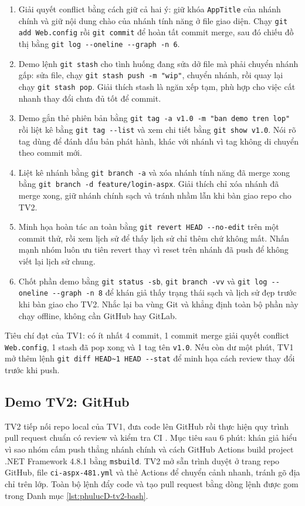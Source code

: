 \begin{enumerate}
\item Giải quyết conflict bằng cách giữ cả hai ý: giữ khóa \verb|AppTitle| của nhánh chính và giữ nội dung chào của nhánh tính năng ở file giao diện.
Chạy \verb|git add Web.config| rồi \verb|git commit| để hoàn tất commit merge, sau đó chiếu đồ thị bằng \verb|git log --oneline --graph -n 6|.
\item Demo lệnh \verb|git stash| cho tình huống đang sửa dở file mà phải chuyển nhánh gấp: sửa file, chạy \verb|git stash push -m "wip"|, chuyển nhánh, rồi quay lại chạy \verb|git stash pop|.
Giải thích stash là ngăn xếp tạm, phù hợp cho việc cất nhanh thay đổi chưa đủ tốt để commit.
\item Demo gắn thẻ phiên bản bằng \verb|git tag -a v1.0 -m "ban demo tren lop"| rồi liệt kê bằng \verb|git tag --list| và xem chi tiết bằng \verb|git show v1.0|.
Nói rõ tag dùng để đánh dấu bản phát hành, khác với nhánh vì tag không di chuyển theo commit mới.
\item Liệt kê nhánh bằng \verb|git branch -a| và xóa nhánh tính năng đã merge xong bằng \verb|git branch -d feature/login-aspx|.
Giải thích chỉ xóa nhánh đã merge xong, giữ nhánh chính sạch và tránh nhầm lẫn khi bàn giao repo cho TV2.
\item Minh họa hoàn tác an toàn bằng \verb|git revert HEAD --no-edit| trên một commit thử, rồi xem lịch sử để thấy lịch sử chỉ thêm chứ không mất.
Nhấn mạnh nhóm luôn ưu tiên revert thay vì reset trên nhánh đã push để không viết lại lịch sử chung.
\item Chốt phần demo bằng \verb|git status -sb|, \verb|git branch -vv| và \verb|git log --oneline --graph -n 8| để khán giả thấy trạng thái sạch và lịch sử đẹp trước khi bàn giao cho TV2.
Nhắc lại ba vùng Git và khẳng định toàn bộ phần này chạy offline, không cần GitHub hay GitLab.
\end{enumerate}

Tiêu chí đạt của TV1: có ít nhất 4 commit, 1 commit merge giải quyết conflict \verb|Web.config|, 1 stash đã pop xong và 1 tag tên \verb|v1.0|.
Nếu còn dư một phút, TV1 mở thêm lệnh \verb|git diff HEAD~1 HEAD --stat| để minh họa cách review thay đổi trước khi push.

\subsection{Demo TV2: GitHub}
\label{subsec:phulucD-tv2}

TV2 tiếp nối repo local của TV1, đưa code lên GitHub rồi thực hiện quy trình pull request chuẩn có review và kiểm tra CI \cite{githubdocs,ghactions}.
Mục tiêu sau 6 phút: khán giả hiểu vì sao nhóm cấm push thẳng nhánh chính và cách GitHub Actions build project .NET Framework 4.8.1 bằng \verb|msbuild|.
TV2 mở sẵn trình duyệt ở trang repo GitHub, file \verb|ci-aspx-481.yml| và thẻ Actions để chuyển cảnh nhanh, tránh gõ địa chỉ trên lớp.
Toàn bộ lệnh đẩy code và tạo pull request bằng dòng lệnh được gom trong Danh mục \ref{lst:phulucD-tv2-bash}.

